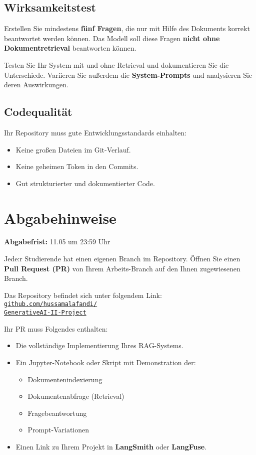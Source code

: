 \documentclass[12pt]{article}
\begin{document}
\subsection*{Wirksamkeitstest}
Erstellen Sie mindestens \textbf{fünf Fragen}, die nur mit Hilfe des Dokuments korrekt beantwortet werden können. Das Modell soll diese Fragen \textbf{nicht ohne Dokumentretrieval} beantworten können.

Testen Sie Ihr System mit und ohne Retrieval und dokumentieren Sie die Unterschiede. Variieren Sie außerdem die \textbf{System-Prompts} und analysieren Sie deren Auswirkungen.

\subsection*{Codequalität}
Ihr Repository muss gute Entwicklungsstandards einhalten:
\begin{itemize}[noitemsep]
  \item Keine großen Dateien im Git-Verlauf.
  \item Keine geheimen Token in den Commits.
  \item Gut strukturierter und dokumentierter Code.
\end{itemize}

\section*{Abgabehinweise}

\textcolor{linkblue}{\textbf{Abgabefrist:} 11.05 um 23:59 Uhr}

Jede:r Studierende hat einen eigenen Branch im Repository. Öffnen Sie einen \textcolor{linkblue}{\textbf{Pull Request (PR)}} von Ihrem Arbeits-Branch auf den Ihnen zugewiesenen Branch.

Das Repository befindet sich unter folgendem Link: 
\href{https://github.com/hussamalafandi/GenerativeAI-II-Project}{%
\texttt{github.com/hussamalafandi/\\GenerativeAI-II-Project}}

Ihr PR muss Folgendes enthalten:
\begin{itemize}[noitemsep]
  \item Die vollständige Implementierung Ihres RAG-Systems.
  \item Ein Jupyter-Notebook oder Skript mit Demonstration der:
    \begin{itemize}[noitemsep]
      \item Dokumentenindexierung
      \item Dokumentenabfrage (Retrieval)
      \item Fragebeantwortung
      \item Prompt-Variationen
    \end{itemize}
  \item Einen Link zu Ihrem Projekt in \textbf{LangSmith} oder \textbf{LangFuse}.
\end{itemize}
\end{document}
